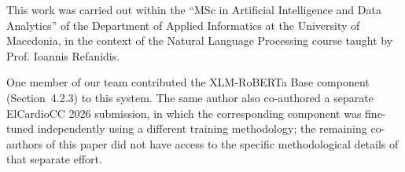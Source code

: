\begin{acknowledgments}
This work was carried out within the ``MSc in Artificial Intelligence and Data Analytics''
of the Department of Applied Informatics at the University of Macedonia, in the context
of the Natural Language Processing course taught by Prof. Ioannis Refanidis.

One member of our team contributed the XLM-RoBERTa Base component (Section~4.2.3) to
this system. The same author also co-authored a separate ElCardioCC 2026 submission, in
which the corresponding component was fine-tuned independently using a different training
methodology; the remaining co-authors of this paper did not have access to the specific
methodological details of that separate effort.
\end{acknowledgments}
